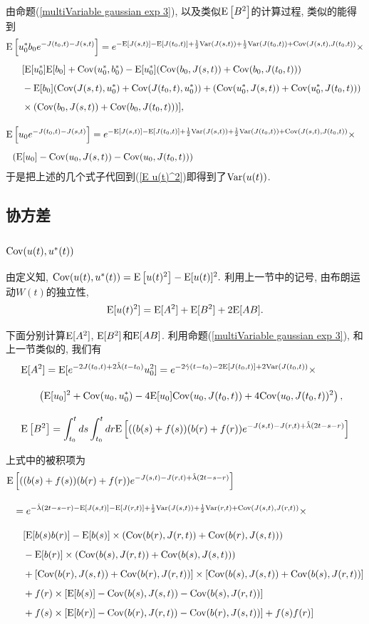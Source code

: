 \documentclass[notitlepage,cs4size,punct,oneside]{ctexrep}
\numberwithin{equation}{section}
\theoremstyle{mystyle}
\newcommand{\nq}{\\[5pt]}
\newcommand{\nw}{\\[10pt]}
\begin{document}
由命题(\ref{multiVariable gaussian exp 3}), 以及类似$\text{E}\left[B^2\right]$的计算过程, 类似的能得到
\[
\begin{split}
\E&\left[u_0^*b_0e^{-J(t_0, t)-J(s, t)}\right] = e^{-\E[J(s, t)]-\E[J(t_0, t)]+\frac{1}{2}\Var(J(s, t))+\frac{1}{2}\Var(J(t_0, t))+\Cov(J(s, t), J(t_0, t))}\times \nq
&\quad[\E[u_0^*]\E[b_0]+\Cov(u_0^*, b_0^*) - \E[u_0^*](\Cov(b_0, J(s, t))+\Cov(b_0, J(t_0, t))) \nq
&\quad-\E[b_0](\Cov(J(s, t), u_0^*)+\Cov(J(t_0, t), u_0^*))+(\Cov(u_0^*, J(s, t))+\Cov(u_0^*, J(t_0, t))) \nq
&\quad\times(\Cov(b_0, J(s, t))+\Cov(b_0, J(t_0, t)))], \nw
\E&\left[u_0e^{-J(t_0, t)-J(s, t)}\right] = e^{-\E[J(s, t)]-\E[J(t_0, t)]+\frac{1}{2}\Var(J(s, t))+\frac{1}{2}\Var(J(t_0, t))+\Cov(J(s, t), J(t_0, t))}\times \nq
&(\E[u_0]-\Cov(u_0, J(s, t))-\Cov(u_0, J(t_0, t)))
\end{split}
\]
于是把上述的几个式子代回到(\ref{E u(t)^2})即得到了$\text{Var}(u(t))$.

\subsection{协方差}
\subsubsection{$\text{Cov}(u(t), u^*(t))$}
由定义知,
$
\text{Cov}(u(t), u^*(t)) = \text{E}\left[u(t)^2\right]-\text{E}[u(t)]^2.
$
利用上一节中的记号, 由布朗运动$W(t)$的独立性,
\[
\text{E}[u(t)^2] = \text{E}[A^2]+\text{E}[B^2]+2\text{E}[AB].
\]

下面分别计算$\text{E}[A^2]$, $\text{E}[B^2]$和$\text{E}[AB]$.
利用命题(\ref{multiVariable gaussian exp 3}), 和上一节类似的, 我们有
\[
\begin{split}
\E&[A^2] = \E[e^{-2J(t_0, t)+2\hat\lambda(t-t_0)}u_0^2] = e^{-2\hat\gamma(t-t_0)-2\E[J(t_0, t)]+2\Var(J(t_0, t))}\times \nw
&\quad\left(\E[u_0]^2+\Cov(u_0, u_0^*)-4\E[u_0]\Cov(u_0, J(t_0, t))+4\Cov(u_0, J(t_0, t))^2\right), \nw
\E&\left[B^2\right] = \int_{t_0}^t ds \int_{t_0}^t dr \E\left[((b(s)+f(s))(b(r)+f(r))e^{-J(s, t)-J(r, t)+\hat\lambda(2t-s-r)}\right]
\end{split}
\]

上式中的被积项为
\[
\begin{split}
\E&\left[((b(s)+f(s))(b(r)+f(r))e^{-J(s, t)-J(r, t)+\hat\lambda(2t-s-r)}\right] \nw
&= e^{-\hat\lambda(2t-s-r)-\E[J(s, t)]-\E[J(r, t)]+\frac{1}{2}\Var(J(s, t))+\frac{1}{2}\Var(r, t)+\Cov(J(s, t), J(r, t))} \times \nw
&\quad [\E[b(s)b(r)]-\E[b(s)]\times(\Cov(b(r), J(r, t))+\Cov(b(r), J(s, t))) \nq
&\quad- \E[b(r)]\times(\Cov(b(s), J(r, t))+\Cov(b(s), J(s, t))) \nq
&\quad + [\Cov(b(r), J(s, t))+\Cov(b(r), J(r, t))]\times[\Cov(b(s), J(s, t))+\Cov(b(s), J(r, t))]\nq
&\quad + f(r)\times[\E[b(s)]-\Cov(b(s), J(s, t))-\Cov(b(s), J(r, t))]\nq
&\quad +f(s)\times[\E[b(r)]-\Cov(b(r), J(r, t))-\Cov(b(r), J(s, t))]+f(s)f(r)]
\end{split}
\]
\end{document}
